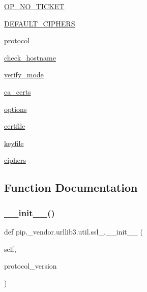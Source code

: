 \begin{DoxyCompactItemize}
\item 
\hyperlink{namespacepip_1_1__vendor_1_1urllib3_1_1util_1_1ssl___ae73f81c6b4d8752afe9858c13db2f879}{O\+P\+\_\+\+N\+O\+\_\+\+T\+I\+C\+K\+ET}
\item 
\hyperlink{namespacepip_1_1__vendor_1_1urllib3_1_1util_1_1ssl___a2c81e36e8fd1e47bbe96d40abdb820ef}{D\+E\+F\+A\+U\+L\+T\+\_\+\+C\+I\+P\+H\+E\+RS}
\item 
\hyperlink{namespacepip_1_1__vendor_1_1urllib3_1_1util_1_1ssl___a14dd8710908f816c17ed5ed59b911cfa}{protocol}
\item 
\hyperlink{namespacepip_1_1__vendor_1_1urllib3_1_1util_1_1ssl___af6ee50d612152f5696d124ca1aada680}{check\+\_\+hostname}
\item 
\hyperlink{namespacepip_1_1__vendor_1_1urllib3_1_1util_1_1ssl___a9e9e3665bd819d482543405881ac6bec}{verify\+\_\+mode}
\item 
\hyperlink{namespacepip_1_1__vendor_1_1urllib3_1_1util_1_1ssl___a5a09a7c6d1225b5516ad299dfcbb4476}{ca\+\_\+certs}
\item 
\hyperlink{namespacepip_1_1__vendor_1_1urllib3_1_1util_1_1ssl___a2ecd526c113b46485095d1d8d6fbedee}{options}
\item 
\hyperlink{namespacepip_1_1__vendor_1_1urllib3_1_1util_1_1ssl___aca2995b84eedf111317e97c91e894ef5}{certfile}
\item 
\hyperlink{namespacepip_1_1__vendor_1_1urllib3_1_1util_1_1ssl___a63fac30b281feb3808f4aaf098f65de9}{keyfile}
\item 
\hyperlink{namespacepip_1_1__vendor_1_1urllib3_1_1util_1_1ssl___a8cf96bb5b5358ce52fc3624e2cd048d3}{ciphers}
\end{DoxyCompactItemize}


\subsection{Function Documentation}
\mbox{\label{namespacepip_1_1__vendor_1_1urllib3_1_1util_1_1ssl___a7341a76f234e4a631f8ddc4569cc7e94}} 
\subsubsection{\texorpdfstring{\+\_\+\+\_\+init\+\_\+\+\_\+()}{\_\_init\_\_()}}
{\footnotesize\ttfamily def pip.\+\_\+vendor.\+urllib3.\+util.\+ssl\+\_\+.\+\_\+\+\_\+init\+\_\+\+\_\+ (\begin{DoxyParamCaption}\item[{}]{self,  }\item[{}]{protocol\+\_\+version }\end{DoxyParamCaption})}

